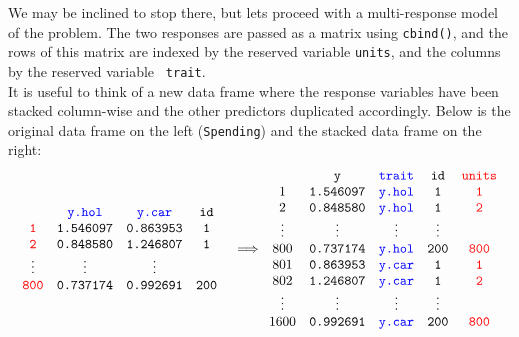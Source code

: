\documentclass{article}
\begin{document}
 We may be inclined to stop there, but lets proceed with a multi-response model of the problem. The two responses are passed as a matrix using \texttt{cbind()}, and the rows of this matrix are indexed by the reserved variable {\color{red} \texttt{units}}, and the columns by the reserved variable \texttt{\color{blue} \texttt{trait}}.\\ 

It is useful to think of a new data frame where the response variables have been stacked column-wise and the other predictors duplicated accordingly. Below is the original data frame on the left (\texttt{Spending}) and the stacked data frame on the right:\\  

\begin{displaymath}
\begin{array}{cc}
\begin{array}{cccc}
&{\color{blue} \texttt{y.hol}}&{\color{blue} \texttt{y.car}}&\texttt{id}\\
{\color{red} \texttt{1}}&\texttt{1.546097}&\texttt{0.863953}&\texttt{1}\\
{\color{red} \texttt{2}}&\texttt{0.848580}&\texttt{1.246807}&\texttt{1}\\
\vdots&\vdots&\vdots\\
{\color{red} \texttt{800}}&\texttt{0.737174}&\texttt{0.992691}&\texttt{200}\\
\end{array}&
\Longrightarrow
\begin{array}{ccccc}
&\texttt{y}&{\color{blue} \texttt{trait}}&\texttt{id}&{\color{red} \texttt{units}}\\
1&\texttt{1.546097}&{\color{blue} \texttt{y.hol}}&\texttt{1}&{\color{red} \texttt{1}}\\
2&\texttt{0.848580}&{\color{blue} \texttt{y.hol}}&\texttt{1}&{\color{red} \texttt{2}}\\
\vdots&\vdots&\vdots&\vdots\\
800&\texttt{0.737174}&{\color{blue} \texttt{y.hol}}&\texttt{200}&{\color{red} \texttt{800}}\\
801&\texttt{0.863953}&{\color{blue} \texttt{y.car}}&\texttt{1}&{\color{red} \texttt{1}}\\
802&\texttt{1.246807}&{\color{blue} \texttt{y.car}}&\texttt{1}&{\color{red} \texttt{2}}\\
\vdots&\vdots&\vdots&\vdots\\
1600&\texttt{0.992691}&{\color{blue} \texttt{y.car}}&\texttt{200}&{\color{red} \texttt{800}}\\
\end{array}
\end{array}
\end{displaymath}
\end{document}
